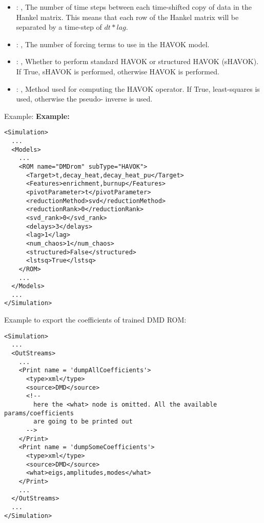 \begin{itemize}
    \item {}: , 
      The number of time steps between each time-shifted copy of data in the Hankel matrix.
      This means that each row of the Hankel matrix will be separated by a time-step of $dt * lag$.

    \item {}: , 
      The number of forcing terms to use in the HAVOK model.

    \item {}: , 
      Whether to perform standard HAVOK or structured HAVOK (sHAVOK).
      If True, sHAVOK is performed, otherwise HAVOK is performed.

    \item {}: , 
      Method used for computing the HAVOK operator.
      If True, least-squares is used, otherwise the pseudo- inverse is used.
  \end{itemize}

\hspace{24pt}
Example:
\textbf{Example:}
\begin{lstlisting}[style=XML,morekeywords={name,subType}]
<Simulation>
  ...
  <Models>
    ...
    <ROM name="DMDrom" subType="HAVOK">
      <Target>t,decay_heat,decay_heat_pu</Target>
      <Features>enrichment,burnup</Features>
      <pivotParameter>t</pivotParameter>
      <reductionMethod>svd</reductionMethod>
      <reductionRank>0</reductionRank>
      <svd_rank>0</svd_rank>
      <delays>3</delays>
      <lag>1</lag>
      <num_chaos>1</num_chaos>
      <structured>False</structured>
      <lstsq>True</lstsq>
    </ROM>
    ...
  </Models>
  ...
</Simulation>
\end{lstlisting}

Example to export the coefficients of trained DMD ROM:
\begin{lstlisting}[style=XML,morekeywords={name,subType}]
<Simulation>
  ...
  <OutStreams>
    ...
    <Print name = 'dumpAllCoefficients'>
      <type>xml</type>
      <source>DMD</source>
      <!--
        here the <what> node is omitted. All the available params/coefficients
        are going to be printed out
      -->
    </Print>
    <Print name = 'dumpSomeCoefficients'>
      <type>xml</type>
      <source>DMD</source>
      <what>eigs,amplitudes,modes</what>
    </Print>
    ...
  </OutStreams>
  ...
</Simulation>
\end{lstlisting}


